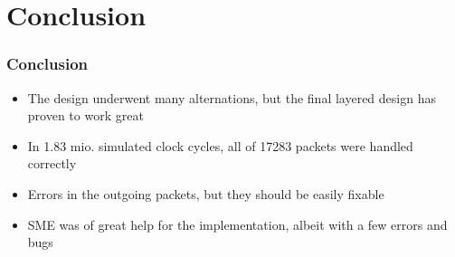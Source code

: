 % 
% 
% 
% 

\section{Conclusion}
\begin{frame}
  \frametitle{Conclusion}

\begin{itemize}
\item The design underwent many alternations, but the final layered design
has proven to work great
\item In 1.83 mio. simulated clock cycles, all of 17283 packets were handled
correctly

\item Errors in the outgoing packets, but they should be easily fixable

\item SME was of great help for the implementation, albeit with a few errors and
bugs

\end{itemize}

\end{frame}
